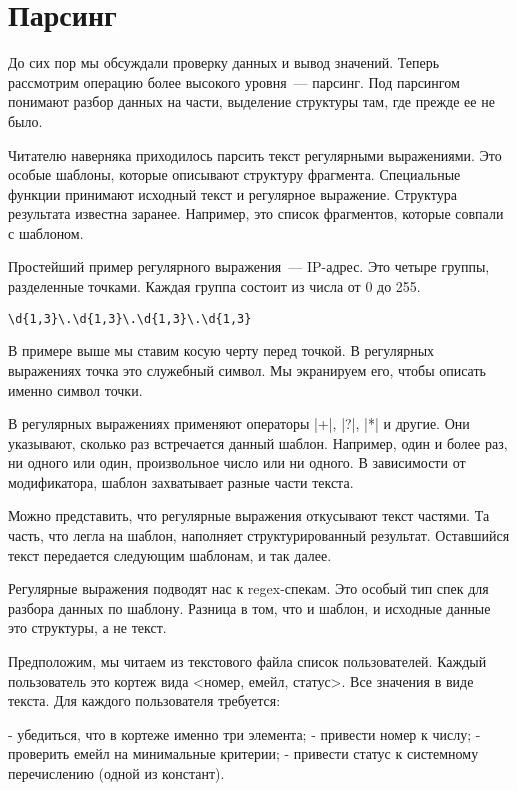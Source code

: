 \section{Парсинг}

До сих пор мы обсуждали проверку данных и вывод значений. Теперь рассмотрим
операцию более высокого уровня~--- парсинг. Под парсингом понимают разбор данных
на части, выделение структуры там, где прежде ее не было.

Читателю наверняка приходилось парсить текст регулярными выражениями. Это особые
шаблоны, которые описывают структуру фрагмента. Специальные функции принимают
исходный текст и регулярное выражение. Структура результата известна
заранее. Например, это список фрагментов, которые совпали с шаблоном.

Простейший пример регулярного выражения~--- IP-адрес. Это четыре группы,
разделенные точками. Каждая группа состоит из числа от 0 до 255.

\begin{verbatim}
\d{1,3}\.\d{1,3}\.\d{1,3}\.\d{1,3}
\end{verbatim}

В примере выше мы ставим косую черту перед точкой. В регулярных выражениях точка
это служебный символ. Мы экранируем его, чтобы описать именно символ точки.

В регулярных выражениях применяют операторы \spverb|+|, \spverb|?|, \spverb|*| и другие. Они
указывают, сколько раз встречается данный шаблон. Например, один и более раз, ни
одного или один, произвольное число или ни одного. В зависимости от
модификатора, шаблон захватывает разные части текста.

Можно представить, что регулярные выражения откусывают текст частями. Та часть,
что легла на шаблон, наполняет структурированный результат. Оставшийся текст
передается следующим шаблонам, и так далее.

Регулярные выражения подводят нас к regex-спекам. Это особый тип спек для
разбора данных по шаблону. Разница в том, что и шаблон, и исходные данные это
структуры, а не текст.

Предположим, мы читаем из текстового файла список пользователей. Каждый
пользователь это кортеж вида <номер, емейл, статус>. Все значения в виде
текста. Для каждого пользователя требуется:

- убедиться, что в кортеже именно три элемента;
- привести номер к числу;
- проверить емейл на минимальные критерии;
- привести статус к системному перечислению (одной из констант).

